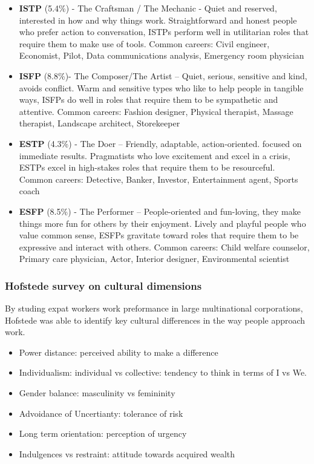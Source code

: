 \documentclass[]{book}
\providecommand{\tightlist}{%
  \setlength{\itemsep}{0pt}\setlength{\parskip}{0pt}}
\begin{document}
\begin{itemize}
\item
  \textbf{ISTP} (5.4\%) - The Craftsman / The Mechanic - Quiet and reserved, interested in how and why things work. Straightforward and honest people who prefer action to conversation, ISTPs perform well in utilitarian roles that require them to make use of tools. Common careers: Civil engineer, Economist, Pilot, Data communications analysis, Emergency room physician
\item
  \textbf{ISFP} (8.8\%)- The Composer/The Artist -- Quiet, serious, sensitive and kind, avoids conflict. Warm and sensitive types who like to help people in tangible ways, ISFPs do well in roles that require them to be sympathetic and attentive. Common careers: Fashion designer, Physical therapist, Massage therapist, Landscape architect, Storekeeper
\item
  \textbf{ESTP} (4.3\%) - The Doer -- Friendly, adaptable, action-oriented. focused on immediate results. Pragmatists who love excitement and excel in a crisis, ESTPs excel in high-stakes roles that require them to be resourceful. Common careers: Detective, Banker, Investor, Entertainment agent, Sports coach
\item
  \textbf{ESFP} (8.5\%) - The Performer -- People-oriented and fun-loving, they make things more fun for others by their enjoyment. Lively and playful people who value common sense, ESFPs gravitate toward roles that require them to be expressive and interact with others. Common careers: Child welfare counselor, Primary care physician, Actor, Interior designer, Environmental scientist
\end{itemize}

\hypertarget{hofstede-survey-on-cultural-dimensions}{%
\subsubsection{Hofstede survey on cultural dimensions}\label{hofstede-survey-on-cultural-dimensions}}

By studing expat workers work preformance in large multinational corporations, Hofstede was able to identify key cultural differences in the way people approach work. \citep{Hofstede2010}

\begin{itemize}
\tightlist
\item
  Power distance: perceived ability to make a difference
\item
  Individualism: individual vs collective: tendency to think in terms of I vs We.
\item
  Gender balance: masculinity vs femininity
\item
  Advoidance of Uncertianty: tolerance of risk
\item
  Long term orientation: perception of urgency\\
\item
  Indulgences vs restraint: attitude towards acquired wealth
\end{itemize}
\end{document}

